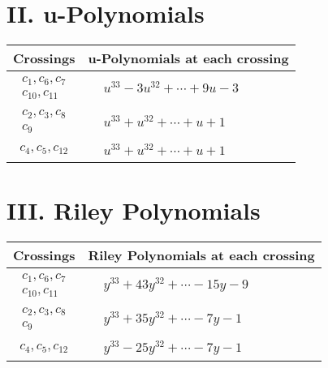 \documentclass[1p]{elsarticle_modified}
\theoremstyle{definition}
\begin{document}
\newpage\renewcommand{\arraystretch}{1}
\centering \section*{ II. u-Polynomials}
\begin{tabular}{m{50pt}|m{274pt}}
Crossings & \hspace{64pt}u-Polynomials at each crossing \\
\hline $$\begin{aligned}c_{1},c_{6},c_{7}\\c_{10},c_{11}\end{aligned}$$&$\begin{aligned}
&u^{33}-3 u^{32}+\cdots+9 u-3
\end{aligned}$\\
\hline $$\begin{aligned}c_{2},c_{3},c_{8}\\c_{9}\end{aligned}$$&$\begin{aligned}
&u^{33}+u^{32}+\cdots+u+1
\end{aligned}$\\
\hline $$\begin{aligned}c_{4},c_{5},c_{12}\end{aligned}$$&$\begin{aligned}
&u^{33}+u^{32}+\cdots+u+1
\end{aligned}$\\
\hline
\end{tabular}\newpage\renewcommand{\arraystretch}{1}
\centering \section*{ III. Riley Polynomials}
\begin{tabular}{m{50pt}|m{274pt}}
Crossings & \hspace{64pt}Riley Polynomials at each crossing \\
\hline $$\begin{aligned}c_{1},c_{6},c_{7}\\c_{10},c_{11}\end{aligned}$$&$\begin{aligned}
&y^{33}+43 y^{32}+\cdots-15 y-9
\end{aligned}$\\
\hline $$\begin{aligned}c_{2},c_{3},c_{8}\\c_{9}\end{aligned}$$&$\begin{aligned}
&y^{33}+35 y^{32}+\cdots-7 y-1
\end{aligned}$\\
\hline $$\begin{aligned}c_{4},c_{5},c_{12}\end{aligned}$$&$\begin{aligned}
&y^{33}-25 y^{32}+\cdots-7 y-1
\end{aligned}$\\
\hline
\end{tabular}
\vskip 2pc
\end{document}
